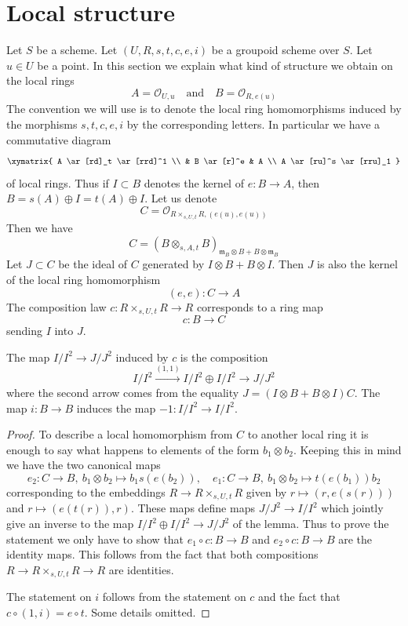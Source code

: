 \section{Local structure}
\label{section-local}

\noindent
Let $S$ be a scheme.
Let $(U, R, s, t, c, e, i)$ be a groupoid scheme over $S$.
Let $u \in U$ be a point. In this section we explain what
kind of structure we obtain on the local rings
$$
A = \mathcal{O}_{U, u}
\quad\text{and}\quad
B = \mathcal{O}_{R, e(u)}
$$
The convention we will use is to denote the local ring homomorphisms
induced by the morphisms $s, t, c, e, i$ by the corresponding letters.
In particular we have a commutative diagram
$$
\xymatrix{
A \ar[rd]_t \ar[rrd]^1 \\
& B \ar[r]^e & A \\
A \ar[ru]^s \ar[rru]_1
}
$$
of local rings. Thus if $I \subset B$ denotes the kernel of $e : B \to A$,
then $B = s(A) \oplus I = t(A) \oplus I$. Let us denote
$$
C = \mathcal{O}_{R \times_{s, U, t} R, (e(u), e(u))}
$$
Then we have
$$
C = (B \otimes_{s, A, t} B)_{\mathfrak m_B \otimes B + B \otimes \mathfrak m_B}
$$
Let $J \subset C$ be the ideal of $C$ generated by $I \otimes B + B \otimes I$.
Then $J$ is also the kernel of the local ring homomorphism
$$
(e, e) : C \longrightarrow A
$$
The composition law $c : R \times_{s, U, t} R \to R$ corresponds to a
ring map
$$
c : B \longrightarrow C
$$
sending $I$ into $J$.

\begin{lemma}
\label{lemma-first-order-structure-c}
The map $I/I^2 \to J/J^2$ induced by $c$ is the composition
$$
I/I^2 \xrightarrow{(1, 1)} I/I^2 \oplus I/I^2 \to J/J^2
$$
where the second arrow comes from the equality
$J = (I \otimes B + B \otimes I)C$.
The map $i : B \to B$ induces the map $-1 : I/I^2 \to I/I^2$.
\end{lemma}

\begin{proof}
To describe a local homomorphism from $C$ to another local ring
it is enough to say what happens to elements of the form
$b_1 \otimes b_2$. Keeping this in mind we have the two canonical maps
$$
e_2 : C \to B,\ b_1 \otimes b_2 \mapsto b_1s(e(b_2)),\quad
e_1 : C \to B,\ b_1 \otimes b_2 \mapsto t(e(b_1))b_2
$$
corresponding to the embeddings
$R \to R \times_{s, U, t} R$ given by
$r \mapsto (r, e(s(r)))$ and $r \mapsto (e(t(r)), r)$.
These maps define maps $J/J^2 \to I/I^2$ which jointly
give an inverse to the map $I/I^2 \oplus I/I^2 \to J/J^2$
of the lemma. Thus to prove the statement we only have to show
that $e_1 \circ c : B \to B$ and $e_2 \circ c : B \to B$
are the identity maps. This follows from the fact that both
compositions $R \to R \times_{s, U, t} R \to R$ are identities.

\medskip\noindent
The statement on $i$ follows from the statement on $c$ and the
fact that $c \circ (1, i) = e \circ t$. Some details omitted.
\end{proof}






